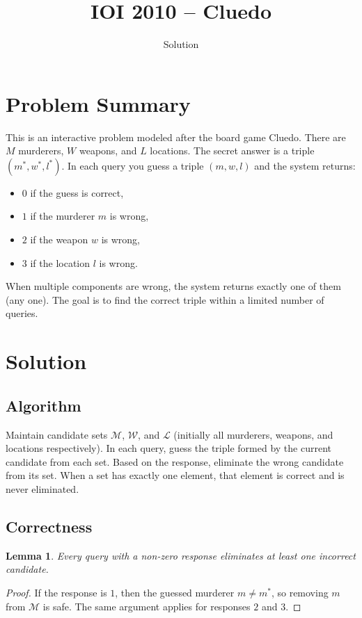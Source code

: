 \documentclass[11pt,a4paper]{article}
\title{IOI 2010 -- Cluedo}
\author{Solution}
\date{}
\newtheorem{lemma}[theorem]{Lemma}
\begin{document}
\maketitle

\section{Problem Summary}
This is an interactive problem modeled after the board game Cluedo. There are $M$ murderers, $W$ weapons, and $L$ locations. The secret answer is a triple $(m^*, w^*, l^*)$. In each query you guess a triple $(m, w, l)$ and the system returns:
\begin{itemize}
    \item $0$ if the guess is correct,
    \item $1$ if the murderer $m$ is wrong,
    \item $2$ if the weapon $w$ is wrong,
    \item $3$ if the location $l$ is wrong.
\end{itemize}
When multiple components are wrong, the system returns exactly one of them (any one). The goal is to find the correct triple within a limited number of queries.

\section{Solution}
\subsection{Algorithm}
Maintain candidate sets $\mathcal{M}$, $\mathcal{W}$, and $\mathcal{L}$ (initially all murderers, weapons, and locations respectively). In each query, guess the triple formed by the current candidate from each set. Based on the response, eliminate the wrong candidate from its set. When a set has exactly one element, that element is correct and is never eliminated.

\subsection{Correctness}

\begin{lemma}
Every query with a non-zero response eliminates at least one incorrect candidate.
\end{lemma}
\begin{proof}
If the response is $1$, then the guessed murderer $m \neq m^*$, so removing $m$ from $\mathcal{M}$ is safe. The same argument applies for responses $2$ and $3$.
\end{proof}
\end{document}
